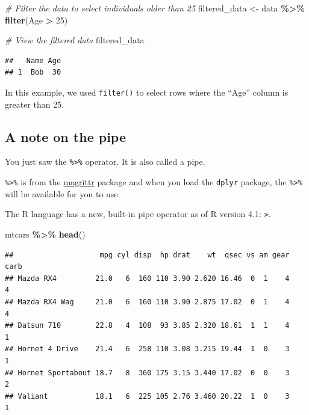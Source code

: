 \documentclass[
]{book}
\newenvironment{Shaded}{\begin{snugshade}}{\end{snugshade}}
\newcommand{\CommentTok}[1]{\textcolor[rgb]{0.56,0.35,0.01}{\textit{#1}}}
\newcommand{\DecValTok}[1]{\textcolor[rgb]{0.00,0.00,0.81}{#1}}
\newcommand{\FunctionTok}[1]{\textcolor[rgb]{0.13,0.29,0.53}{\textbf{#1}}}
\newcommand{\NormalTok}[1]{#1}
\newcommand{\OtherTok}[1]{\textcolor[rgb]{0.56,0.35,0.01}{#1}}
\newcommand{\SpecialCharTok}[1]{\textcolor[rgb]{0.81,0.36,0.00}{\textbf{#1}}}
\begin{document}
\begin{Shaded}
\begin{Highlighting}[]
\CommentTok{\# Filter the data to select individuals older than 25}
\NormalTok{filtered\_data }\OtherTok{\textless{}{-}}\NormalTok{ data }\SpecialCharTok{\%\textgreater{}\%}
  \FunctionTok{filter}\NormalTok{(Age }\SpecialCharTok{\textgreater{}} \DecValTok{25}\NormalTok{)}

\CommentTok{\# View the filtered data}
\NormalTok{filtered\_data}
\end{Highlighting}
\end{Shaded}

\begin{verbatim}
##   Name Age
## 1  Bob  30
\end{verbatim}

In this example, we used \texttt{filter()} to select rows where the ``Age'' column is greater than 25.

\hypertarget{a-note-on-the-pipe}{%
\subsection{A note on the pipe}\label{a-note-on-the-pipe}}

You just saw the \texttt{\%\textgreater{}\%} operator. It is also called a pipe.

\texttt{\%\textgreater{}\%} is from the \href{https://cran.r-project.org/web/packages/magrittr/vignettes/magrittr.html}{magrittr} package and when you load the \texttt{dplyr} package, the \texttt{\%\textgreater{}\%} will be available for you to use.

The R language has a new, built-in pipe operator as of R version 4.1: \texttt{\textbar{}\textgreater{}}.

\begin{Shaded}
\begin{Highlighting}[]
\NormalTok{mtcars }\SpecialCharTok{\%\textgreater{}\%}
  \FunctionTok{head}\NormalTok{()}
\end{Highlighting}
\end{Shaded}

\begin{verbatim}
##                    mpg cyl disp  hp drat    wt  qsec vs am gear carb
## Mazda RX4         21.0   6  160 110 3.90 2.620 16.46  0  1    4    4
## Mazda RX4 Wag     21.0   6  160 110 3.90 2.875 17.02  0  1    4    4
## Datsun 710        22.8   4  108  93 3.85 2.320 18.61  1  1    4    1
## Hornet 4 Drive    21.4   6  258 110 3.08 3.215 19.44  1  0    3    1
## Hornet Sportabout 18.7   8  360 175 3.15 3.440 17.02  0  0    3    2
## Valiant           18.1   6  225 105 2.76 3.460 20.22  1  0    3    1
\end{verbatim}
\end{document}
